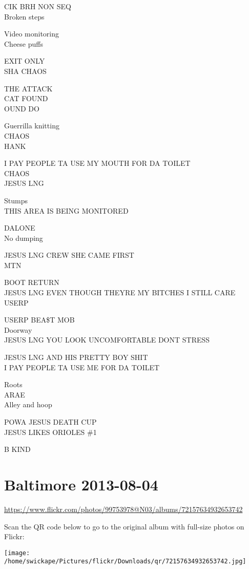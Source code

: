 \documentclass[10pt,letterpaper]{article}
\begin{document}
CIK BRH NON SEQ\\
Broken steps

Video monitoring\\
Cheese puffs

EXIT ONLY\\
SHA CHAOS

THE ATTACK\\
CAT FOUND\\
OUND DO

Guerrilla knitting\\
CHAOS\\
HANK

I PAY PEOPLE TA USE MY MOUTH FOR DA TOILET\\
CHAOS\\
JESUS LNG

Stumps\\
THIS AREA IS BEING MONITORED

DALONE\\
No dumping

JESUS LNG CREW SHE CAME FIRST\\
MTN

BOOT RETURN\\
JESUS LNG EVEN THOUGH THEYRE MY BITCHES I STILL CARE\\
USERP

USERP BEA\$T MOB\\
Doorway\\
JESUS LNG YOU LOOK UNCOMFORTABLE DONT STRESS

JESUS LNG AND HIS PRETTY BOY SHIT\\
I PAY PEOPLE TA USE ME FOR DA TOILET

Roots\\
ARAE\\
Alley and hoop

POWA JESUS DEATH CUP\\
JESUS LIKES ORIOLES \#1

B KIND


\section*{Baltimore 2013-08-04}

\url{https://www.flickr.com/photos/99753978@N03/albums/72157634932653742}

Scan the QR code below to go to the original album with full-size photos on Flickr:

\texttt{[image: /home/swickape/Pictures/flickr/Downloads/qr/72157634932653742.jpg]}
\end{document}
